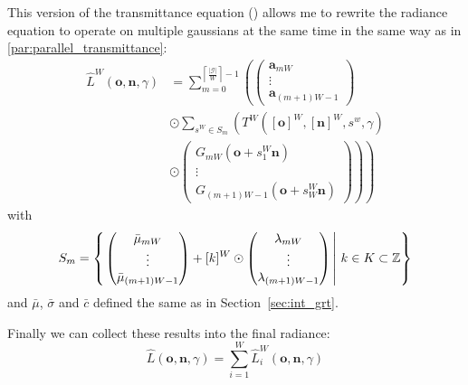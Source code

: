 \documentclass[a4paper, 11pt]{memoir}
\begin{document}
    This version of the \gls{transmittance} equation () allows me to rewrite the \gls{radiance} equation to operate on
    multiple gaussians at the same time in the same way as in \ref{par:parallel_transmittance}:
    \begin{equation}
        \begin{aligned}
            \hat{L}^W(\mathbf{o}, \mathbf{n}, \gamma) &= \sum_{m = 0}^{\left\lceil \frac{|\mathcal{G}|}{W} \right\rceil - 1} \left( \begin{pmatrix}
                \mathbf{a}_{mW}\\ \vdots \\ \mathbf{a}_{(m+1)W - 1}
            \end{pmatrix} \right.\\
            &\odot \sum_{s^W \in S_m} \left( T^W([\mathbf{o}]^W, [\mathbf{n}]^W, s^w, \gamma)\right.\\
            &\odot \left.\left.\begin{pmatrix}
                G_{mW}(\mathbf{o} + s^W_1\mathbf{n})\\ \vdots\\ G_{(m+1)W - 1}(\mathbf{o} + s^W_W\mathbf{n})
            \end{pmatrix}\right)\right)
        \end{aligned}
        \label{eq:radiance_parallel_gaussians}
    \end{equation}
    with
    \[ S_m = \left\{\left. \begin{pmatrix}
        \bar{\mu}_{mW}\\ \vdots\\ \bar{\mu}_{(m+1)W - 1}
    \end{pmatrix} + [k]^W \odot \begin{pmatrix}
        \lambda_{mW}\\ \vdots\\ \lambda_{(m+1)W - 1}
    \end{pmatrix} \,\right|\, k \in K \subset \mathbb{Z} \right\} \]
    and $\bar{\mu}$, $\bar{\sigma}$ and $\bar{c}$ defined the same as in Section~\ref{sec:int_grt}.

    Finally we can collect these results into the final \gls{radiance}:
    \begin{equation}
        \hat{L}(\mathbf{o}, \mathbf{n}, \gamma) = \sum_{i = 1}^W \hat{L}^W_i(\mathbf{o}, \mathbf{n}, \gamma)
        \label{eq:radiance_parallel_final}
    \end{equation}
\end{document}
